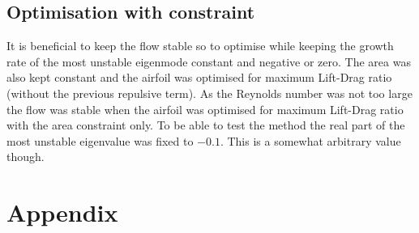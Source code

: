 \documentclass[12pt, a4paper]{article}
\begin{document}
    \subsection{Optimisation with constraint}
        It is beneficial to keep the flow stable so to optimise while keeping the growth rate of the most unstable eigenmode constant and negative or zero. The area was also kept constant and the airfoil was optimised for maximum Lift-Drag ratio (without the previous repulsive term). As the Reynolds number was not too large the flow was stable when the airfoil was optimised for maximum Lift-Drag ratio with the area constraint only. To be able to test the method the real part of the most unstable eigenvalue was fixed to $-0.1$. This is a somewhat arbitrary value though. 
		


\appendix
\section*{Appendix}
\end{document}

